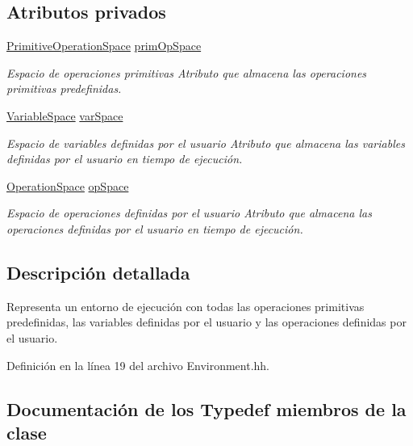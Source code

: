 \subsection*{Atributos privados}
\begin{DoxyCompactItemize}
\item 
\hyperlink{class_primitive_operation_space}{Primitive\+Operation\+Space} \hyperlink{class_environment_a7855273ad2d19ab036495980841e20a4}{prim\+Op\+Space}
\begin{DoxyCompactList}\small\item\em Espacio de operaciones primitivas Atributo que almacena las operaciones primitivas predefinidas. \end{DoxyCompactList}\item 
\hyperlink{class_variable_space}{Variable\+Space} \hyperlink{class_environment_aedf0507f98713f9eb6c152d93c346aa4}{var\+Space}
\begin{DoxyCompactList}\small\item\em Espacio de variables definidas por el usuario Atributo que almacena las variables definidas por el usuario en tiempo de ejecución. \end{DoxyCompactList}\item 
\hyperlink{class_operation_space}{Operation\+Space} \hyperlink{class_environment_a7ab0af9a002f7df22966678a0dd0c366}{op\+Space}
\begin{DoxyCompactList}\small\item\em Espacio de operaciones definidas por el usuario Atributo que almacena las operaciones definidas por el usuario en tiempo de ejecución. \end{DoxyCompactList}\end{DoxyCompactItemize}


\subsection{Descripción detallada}
Representa un entorno de ejecución con todas las operaciones primitivas predefinidas, las variables definidas por el usuario y las operaciones definidas por el usuario. 

Definición en la línea 19 del archivo Environment.\+hh.



\subsection{Documentación de los \textquotesingle{}Typedef\textquotesingle{} miembros de la clase}
